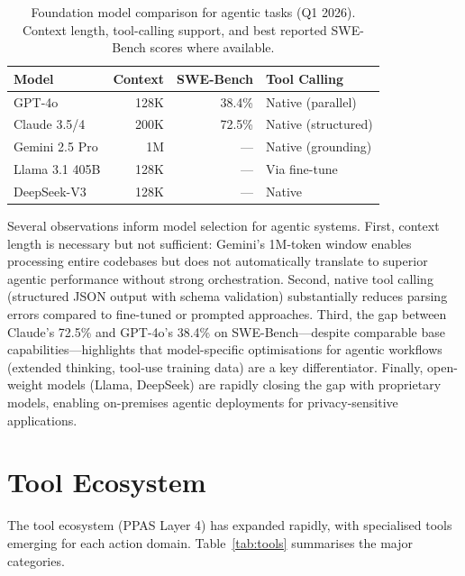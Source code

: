 \documentclass[review,authoryear]{elsarticle}
\theoremstyle{definition}
\begin{document}
\begin{table}[ht]
\centering
\caption{Foundation model comparison for agentic tasks (Q1 2026). Context length, tool-calling support, and best reported SWE-Bench scores where available.}
\label{tab:models}
\begin{tabular}{lrrl}
\toprule
\textbf{Model} & \textbf{Context} & \textbf{SWE-Bench} & \textbf{Tool Calling} \\
\midrule
GPT-4o \citep{openai2024gpt4o}         & 128K   & 38.4\%  & Native (parallel) \\
Claude 3.5/4 \citep{anthropic2024claude} & 200K   & 72.5\%  & Native (structured) \\
Gemini 2.5 Pro \citep{team2023gemini}   & 1M     & ---     & Native (grounding) \\
Llama 3.1 405B \citep{touvron2023llama} & 128K   & ---     & Via fine-tune \\
DeepSeek-V3 \citep{deepseekai2024deepseek} & 128K & ---     & Native \\
\bottomrule
\end{tabular}
\end{table}

Several observations inform model selection for agentic systems. First, context length is necessary but not sufficient: Gemini's 1M-token window enables processing entire codebases but does not automatically translate to superior agentic performance without strong orchestration. Second, native tool calling (structured JSON output with schema validation) substantially reduces parsing errors compared to fine-tuned or prompted approaches. Third, the gap between Claude's 72.5\% and GPT-4o's 38.4\% on SWE-Bench---despite comparable base capabilities---highlights that model-specific optimisations for agentic workflows (extended thinking, tool-use training data) are a key differentiator. Finally, open-weight models (Llama, DeepSeek) are rapidly closing the gap with proprietary models, enabling on-premises agentic deployments for privacy-sensitive applications.

\section{Tool Ecosystem}\label{sec:tools}

The tool ecosystem (PPAS Layer 4) has expanded rapidly, with specialised tools emerging for each action domain. Table~\ref{tab:tools} summarises the major categories.
\end{document}
